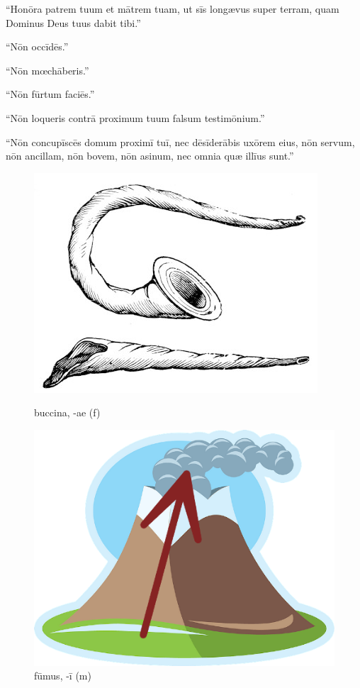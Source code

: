 ``Honōra patrem tuum et
mātrem tuam, ut sīs longævus super terram, quam Dominus
Deus tuus dabit tibi.''

``Nōn occīdēs.''

``Nōn mœchāberis.''

``Nōn fūrtum faciēs.''

``Nōn loqueris contrā proximum tuum falsum testimōnium.''

``Nōn concupīscēs domum
proximī tuī, nec dēsīderābis uxōrem eius, nōn servum, nōn ancillam, nōn
bovem, nōn asinum, nec omnia quæ illīus sunt.''

\begin{figure}[hp]
    \begin{minipage}[hbp]{0.5\linewidth}
        \centering
        \includegraphics{bucina}
        \caption{buccina, -ae (f)}
    \end{minipage}%
    \begin{minipage}[hbp]{0.5\linewidth}
        \centering
        \includegraphics{fumus}
        \caption{fūmus, -ī (m)}
    \end{minipage}
\end{figure}

